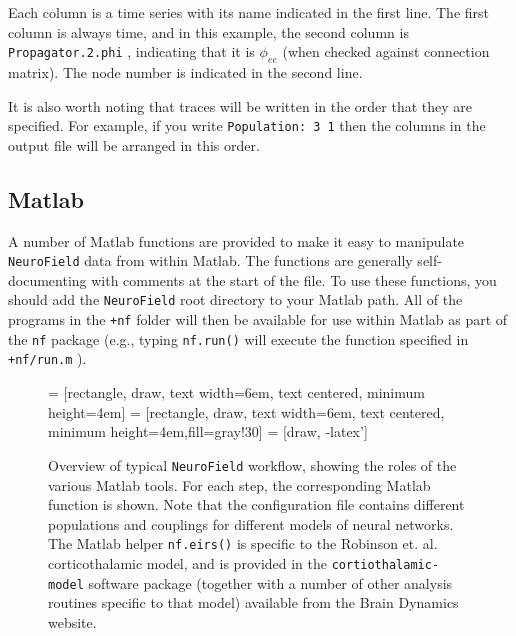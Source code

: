 \documentclass[12pt,a4paper]{article}
\newcommand{\type}[1]{{\small\small\tt #1} }
\newcommand{\NF}[0]{\type{NeuroField}}
\begin{document}
Each column is a time series with its name indicated in the first line. The first column is always time, and in this example, the second column is \type{Propagator.2.phi}, indicating that it is $\phi_{ee}$ (when checked against connection matrix). The node number is indicated in the second line.

It is also worth noting that traces will be written in the order that they are specified. For example, if you write \type{Population: 3 1} then the columns in the output file will be arranged in this order.

\subsection{Matlab}
A number of Matlab functions are provided to make it easy to manipulate \NF data from within Matlab. The functions are generally self-documenting with comments at the start of the file. To use these functions, you should add the \NF root directory to your Matlab path. All of the programs in the \type{+nf} folder will then be available for use within Matlab as part of the \type{nf} package (e.g., typing \type{nf.run()} will execute the function specified in \type{+nf/run.m}).

\begin{figure}[b]
\begin{center}
 = [rectangle, draw, text width=6em, text centered, minimum height=4em]
 = [rectangle, draw, text width=6em, text centered, minimum height=4em,fill=gray!30]
 = [draw, -latex']
\caption{Overview of typical \NF workflow, showing the roles of the various Matlab tools. For each step, the corresponding Matlab function is shown. Note that the configuration file contains different populations and couplings for different models of neural networks. The Matlab helper \type{nf.eirs()} is specific to the Robinson et. al. corticothalamic model, and is provided in the \type{cortiothalamic-model} software package (together with a number of other analysis routines specific to that model) available from the Brain Dynamics website.}
\label{fig:components}
\end{center}
\end{figure}
\end{document}
